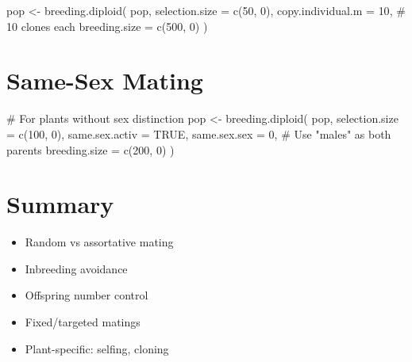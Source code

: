 \documentclass[
  letterpaper,
]{book}
\newenvironment{Shaded}{\begin{snugshade}}{\end{snugshade}}
\newcommand{\AttributeTok}[1]{\textcolor[rgb]{0.40,0.45,0.13}{#1}}
\newcommand{\CommentTok}[1]{\textcolor[rgb]{0.37,0.37,0.37}{#1}}
\newcommand{\ConstantTok}[1]{\textcolor[rgb]{0.56,0.35,0.01}{#1}}
\newcommand{\DecValTok}[1]{\textcolor[rgb]{0.68,0.00,0.00}{#1}}
\newcommand{\FunctionTok}[1]{\textcolor[rgb]{0.28,0.35,0.67}{#1}}
\newcommand{\NormalTok}[1]{\textcolor[rgb]{0.00,0.23,0.31}{#1}}
\newcommand{\OtherTok}[1]{\textcolor[rgb]{0.00,0.23,0.31}{#1}}
\providecommand{\tightlist}{%
  \setlength{\itemsep}{0pt}\setlength{\parskip}{0pt}}
\begin{document}
\begin{Shaded}
\begin{Highlighting}[]
\NormalTok{pop }\OtherTok{\textless{}{-}} \FunctionTok{breeding.diploid}\NormalTok{(}
\NormalTok{  pop,}
  \AttributeTok{selection.size =} \FunctionTok{c}\NormalTok{(}\DecValTok{50}\NormalTok{, }\DecValTok{0}\NormalTok{),}
  \AttributeTok{copy.individual.m =} \DecValTok{10}\NormalTok{,   }\CommentTok{\# 10 clones each}
  \AttributeTok{breeding.size =} \FunctionTok{c}\NormalTok{(}\DecValTok{500}\NormalTok{, }\DecValTok{0}\NormalTok{)}
\NormalTok{)}
\end{Highlighting}
\end{Shaded}

\section{Same-Sex Mating}\label{same-sex-mating}

\begin{Shaded}
\begin{Highlighting}[]
\CommentTok{\# For plants without sex distinction}
\NormalTok{pop }\OtherTok{\textless{}{-}} \FunctionTok{breeding.diploid}\NormalTok{(}
\NormalTok{  pop,}
  \AttributeTok{selection.size =} \FunctionTok{c}\NormalTok{(}\DecValTok{100}\NormalTok{, }\DecValTok{0}\NormalTok{),}
  \AttributeTok{same.sex.activ =} \ConstantTok{TRUE}\NormalTok{,}
  \AttributeTok{same.sex.sex =} \DecValTok{0}\NormalTok{,              }\CommentTok{\# Use "males" as both parents}
  \AttributeTok{breeding.size =} \FunctionTok{c}\NormalTok{(}\DecValTok{200}\NormalTok{, }\DecValTok{0}\NormalTok{)}
\NormalTok{)}
\end{Highlighting}
\end{Shaded}

\section{Summary}\label{summary-8}

\begin{itemize}
\tightlist
\item
  Random vs assortative mating
\item
  Inbreeding avoidance
\item
  Offspring number control
\item
  Fixed/targeted matings
\item
  Plant-specific: selfing, cloning
\end{itemize}
\end{document}
